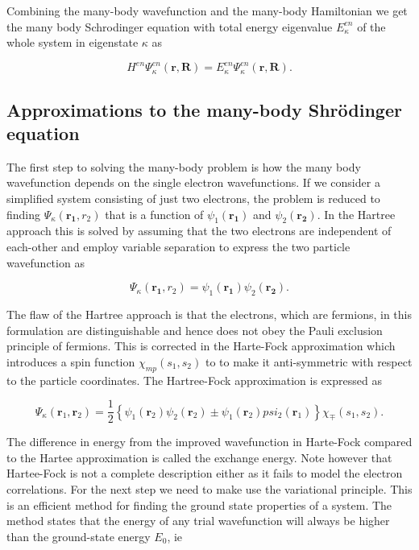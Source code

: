  
Combining the many-body wavefunction and the many-body Hamiltonian we get the many body Schrodinger equation with total energy eigenvalue $E_{\kappa}^{en}$ of the whole system in eigenstate $\kappa$ as
 
\begin{equation}
H^{en}\Psi^{en}_{\kappa}(\boldsymbol{r}, \boldsymbol{R}) = E_{\kappa}^{en}\Psi_{\kappa}^{en}(\boldsymbol{r}, \boldsymbol{R}).
\end{equation}

\subsection{Approximations to the many-body Shr\"{o}dinger equation}

The first step to solving the many-body problem is how the many body wavefunction depends on the single electron wavefunctions. If we consider a simplified system consisting of just two electrons, the problem is reduced to finding $\Psi_{\kappa}(\boldsymbol{r_1}, r_2)$ that is a function of $\psi_1(\boldsymbol{r_1})$ and $\psi_2(\boldsymbol{r_2})$. In the Hartree approach this is solved by assuming that the two electrons are independent of each-other and employ variable separation to express the two particle wavefunction as

\begin{equation}
\Psi_{\kappa}(\boldsymbol{r_1}, r_2) = \psi_1(\boldsymbol{r_1})\psi_2(\boldsymbol{r_2}).
\end{equation}

The flaw of the Hartree approach is that the electrons, which are fermions, in this formulation are distinguishable and hence does not obey the Pauli exclusion principle of fermions. This is corrected in the Harte-Fock approximation which introduces a spin function $\chi_{mp}(s_1, s_2)$ to to make it anti-symmetric with respect to the particle coordinates. The Hartree-Fock approximation is expressed as

\begin{equation}
\Psi_{\kappa}(\boldsymbol{r}_1, \boldsymbol{r}_2) = \frac{1}{2} \left\{ \psi_1(\boldsymbol{r}_2) \psi_2(\boldsymbol{r}_2) \pm \psi_1(\boldsymbol{r}_2) psi_2(\boldsymbol{r}_1) \right\} \chi_{\mp}(s_1, s_2).
\end{equation}  

The difference in energy from the improved wavefunction in Harte-Fock compared to the Hartee approximation is called the exchange energy. Note however that Hartee-Fock is not a complete description either as it fails to model the electron correlations. For the next step we need to make use the variational principle. This is an efficient method for finding the ground state properties of a system. The method states that the energy of any trial wavefunction will always be higher than the ground-state energy $E_0$, ie

